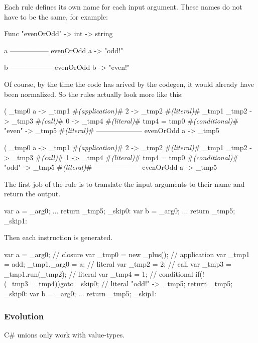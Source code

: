 Each rule defines its own name for each input argument.
These names do not have to be the same, for example:

\begin{code}
    Func "evenOrOdd" -> int -> string
    
    a%
    -----------------
    evenOrOdd a -> "odd!"

    b%
    ------------------
    evenOrOdd b -> "even!"
\end{code}

Of course, by the time the code has arived by the codegen, it would already have been normalized.
So the rules actually look more like this:

\begin{code}
    (%
    _tmp0 a -> _tmp1     #\textit{(application)}#
    2 -> _tmp2           #\textit{(literal)}#
    _tmp1 _tmp2 -> _tmp3 #\textit{(call)}#
    0 -> _tmp4           #\textit{(literal)}#
    tmp4 = tmp0          #\textit{(conditional)}#
    "even" -> _tmp5      #\textit{(literal)}#
    --------------------
    evenOrOdd a -> _tmp5
\end{code}

\begin{code}
    (%
    _tmp0 a -> _tmp1     #\textit{(application)}#
    2 -> _tmp2           #\textit{(literal)}#
    _tmp1 _tmp2 -> _tmp3 #\textit{(call)}#
    1 -> _tmp4           #\textit{(literal)}#
    tmp4 = tmp0          #\textit{(conditional)}#
    "odd" -> _tmp5       #\textit{(literal)}#
    --------------------
    evenOrOdd a -> _tmp5
\end{code}

The first job of the rule is to translate the input arguments to their name and return the output.

\begin{code}
    {
        var a = _arg0; 
        ...
        return _tmp5;
    }
    _skip0:
    {
        var b = _arg0;
        ...
        return _tmp5;
    }
    _skip1:
\end{code}

Then each instruction is generated.

\begin{code}
    {
        var a = _arg0; 
        // closure
        var _tmp0 = new _plus(); 
        // application
        var _tmp1 = add;
        _tmp1._arg0 = a;
        // literal
        var _tmp2 = 2;
        // call
        var _tmp3 = _tmp1.run(_tmp2);
        // literal     
        var _tmp4 = 1;
        // conditional
        if(!(_tmp3=_tmp4)){goto _skip0;}
        // literal
        "odd!" -> _tmp5;
        return _tmp5;
    }
    _skip0:
    {
        var b = _arg0;
        ...
        return _tmp5;
    }
    _skip1:
\end{code}


\subsubsection{Evolution}
C\# unions only work with value-types.


